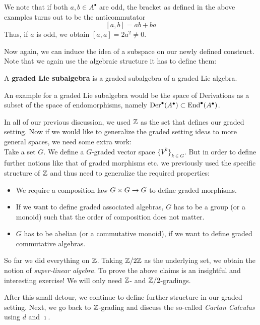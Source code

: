 \begin{rem}
  We note that if both $a,b \in A^\bullet$ are odd, the bracket as defined in the above examples turns out to be the anticommutator
  $$ [a,b] = ab+ba $$ Thus, if $a$ is odd, we obtain $[a,a] = 2a^2 \neq 0$.
\end{rem}

Now again, we can induce the idea of a subspace on our newly defined construct. Note that we again use the algebraic structure it has to define them:

\begin{definition}
  A \textbf{graded Lie subalgebra} is a graded subalgebra of a graded Lie algebra.
\end{definition}

An example for a graded Lie subalgebra would be the space of Derivations as a subset of the space of endomorphisms, namely $\operatorname{Der}^\bullet(A^\bullet) \subset \operatorname{End}^\bullet(A^\bullet)$.

\begin{rem}
  In all of our previous discussion, we used $\mathbb{Z}$ as the set that defines our graded setting. Now if we would like to generalize the graded setting ideas to more general spaces, we need some extra work:\\

  Take a set $G$. We define a $G$-graded vector space $\{V^k\}_{k \in G}$. But in order to define further notions like that of graded morphisms etc. we previously used the specific structure of $\mathbb{Z}$ and thus need to generalize the required properties:
  \begin{itemize}
    \item We require a composition law $G \times G \rightarrow G$ to define graded morphisms.
    \item If we want to define graded associated algebras, $G$ has to be a group (or a monoid) such that the order of composition does not matter.
    \item $G$ has to be abelian (or a commutative monoid), if we want to define graded commutative algebras.
  \end{itemize}
  So far we did everything on $\mathbb{Z}$. Taking $\mathbb{Z} / 2\mathbb{Z}$ as the underlying set, we obtain the notion of \emph{super-linear algebra}. To prove the above claims is an insightful and interesting exercise! We will only need $\mathbb{Z}$- and $\mathbb{Z}/2$-gradings.
\end{rem}

After this small detour, we continue to define further structure in our graded setting. Next, we go back to $\mathbb{Z}$-grading and discuss the so-called \emph{Cartan Calculus} using $d$ and $\imath$.

